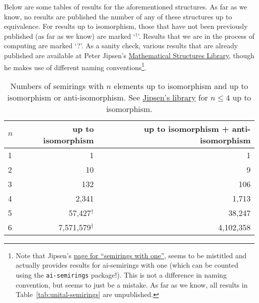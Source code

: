 \documentclass{article}
\theoremstyle{definition}
\theoremstyle{plain}
\begin{document}
Below are some tables of results for the aforementioned structures.
As far as we know, no results are published the number of any of
these structures up to equivalence. For results up to isomorphism,
those that have not been previously published (as far as we know) are
marked `$^\dagger$'. Results that we are in the process of computing
are marked `?'. As a sanity check, various results that are already
published are available at Peter Jipsen's
\href{https://math.chapman.edu/~jipsen/structures/doku.php?id=start}{Mathematical
Structures Library}, though he makes use of different naming
conventions\footnote{Note that Jipsen's
  \href{https://math.chapman.edu/~jipsen/structures/doku.php?id=semirings_with_identity\#finite_members}{page
  for ``semirings with one''}, seems to be mistitled and actually
  provides results for ai-semirings with one (which can be counted
  using the \texttt{ai-semirings} package!). This is not a difference
  in naming convention, but seems to just be a mistake. As far as we
know, all results in Table~\ref{tab:unital-semirings} are unpublished.}.
\begin{table}[ht]
  \centering
  \begin{tabular}{l|r|r}
    \toprule
    $n$ & up to isomorphism & up to isomorphism + anti-isomorphism \\
    \midrule
    1 & 1         & 1         \\
    2 & 10        & 9         \\
    3 & 132       & 106       \\
    4 & 2,341     & 1,713     \\
    5 & 57,427$^\dagger$    & 38,247    \\
    6 & 7,571,579$^\dagger$  & 4,102,358 \\
  \end{tabular}
  \caption{Numbers of semirings with $n$ elements up to isomorphism and up
    to isomorphism or anti-isomorphism. See
    \href{https://math.chapman.edu/~jipsen/structures/doku.php?id=semirings\#finite_members}{Jipsen's
  library} for \(n\leq4\) up to isomorphism.}
  \label{tab:semirings}
\end{table}
\end{document}
